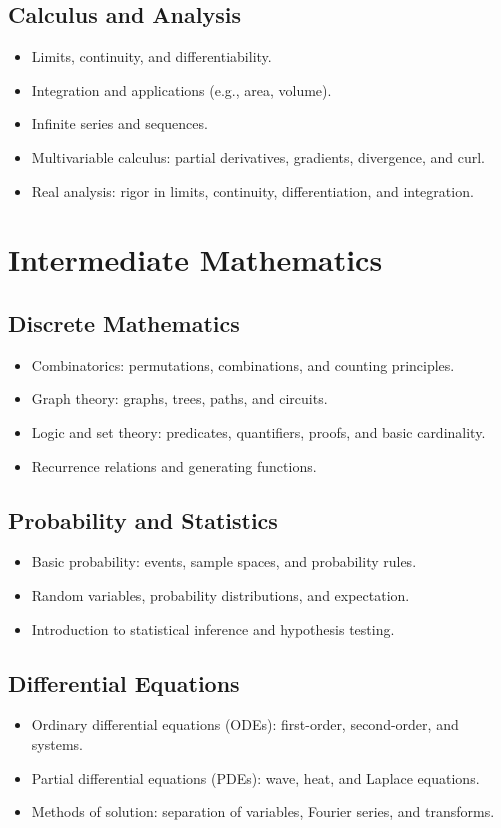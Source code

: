 \documentclass[12pt]{article}
\begin{document}
\subsection{Calculus and Analysis}
\begin{itemize}
    \item Limits, continuity, and differentiability.
    \item Integration and applications (e.g., area, volume).
    \item Infinite series and sequences.
    \item Multivariable calculus: partial derivatives, gradients, divergence, and curl.
    \item Real analysis: rigor in limits, continuity, differentiation, and integration.
\end{itemize}

\section{Intermediate Mathematics}

\subsection{Discrete Mathematics}
\begin{itemize}
    \item Combinatorics: permutations, combinations, and counting principles.
    \item Graph theory: graphs, trees, paths, and circuits.
    \item Logic and set theory: predicates, quantifiers, proofs, and basic cardinality.
    \item Recurrence relations and generating functions.
\end{itemize}

\subsection{Probability and Statistics}
\begin{itemize}
    \item Basic probability: events, sample spaces, and probability rules.
    \item Random variables, probability distributions, and expectation.
    \item Introduction to statistical inference and hypothesis testing.
\end{itemize}

\subsection{Differential Equations}
\begin{itemize}
    \item Ordinary differential equations (ODEs): first-order, second-order, and systems.
    \item Partial differential equations (PDEs): wave, heat, and Laplace equations.
    \item Methods of solution: separation of variables, Fourier series, and transforms.
\end{itemize}
\end{document}

